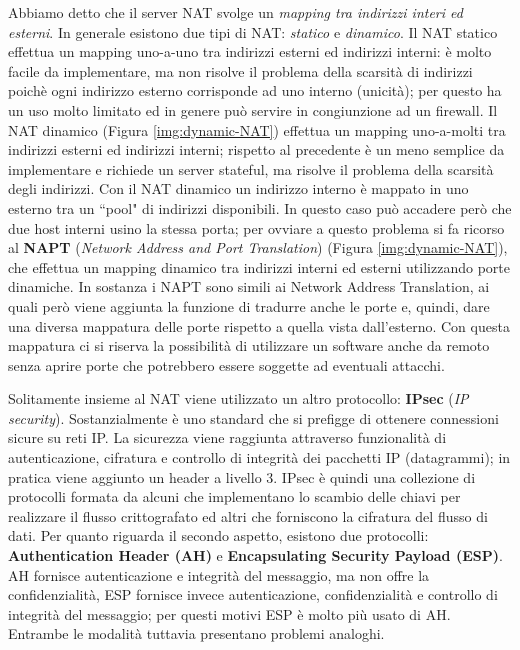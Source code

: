 Abbiamo detto che il server NAT svolge un \textit{mapping tra indirizzi interi ed esterni}. In generale esistono due tipi di NAT: \textit{statico} e \textit{dinamico}. Il NAT statico effettua un mapping uno-a-uno tra indirizzi esterni ed indirizzi interni: è molto facile da implementare, ma non risolve il problema della scarsità di indirizzi poichè ogni indirizzo esterno corrisponde ad uno interno (unicità); per questo ha un uso molto limitato ed in genere può servire in congiunzione ad un firewall. Il NAT dinamico (Figura \ref{img:dynamic-NAT}) effettua un mapping uno-a-molti tra indirizzi esterni ed indirizzi interni; rispetto al precedente è un meno semplice da implementare e richiede un server stateful, ma risolve il problema della scarsità degli indirizzi. Con il NAT dinamico un indirizzo interno è mappato in uno esterno tra un \textquotedblleft pool" di indirizzi disponibili. In questo caso può accadere però che due host interni usino la stessa porta; per ovviare a questo problema si fa ricorso al \textbf{NAPT} (\textit{Network Address and Port Translation}) (Figura \ref{img:dynamic-NAT}), che effettua un mapping dinamico tra indirizzi interni ed esterni utilizzando porte dinamiche. In sostanza i NAPT sono simili ai Network Address Translation, ai quali però viene aggiunta la funzione di tradurre anche le porte e, quindi, dare una diversa mappatura delle porte rispetto a quella vista dall'esterno. Con questa mappatura ci si riserva la possibilità di utilizzare un software anche da remoto senza aprire porte che potrebbero essere soggette ad eventuali attacchi.

Solitamente insieme al NAT viene utilizzato un altro protocollo: \textbf{IPsec} (\textit{IP security}). Sostanzialmente è uno standard che si prefigge di ottenere connessioni sicure su reti IP. La sicurezza viene raggiunta attraverso funzionalità di autenticazione, cifratura e controllo di integrità dei pacchetti IP (datagrammi); in pratica viene aggiunto un header a livello 3. IPsec è quindi una collezione di protocolli formata da alcuni che implementano lo scambio delle chiavi per realizzare il flusso crittografato ed altri che forniscono la cifratura del flusso di dati. Per quanto riguarda il secondo aspetto, esistono due protocolli: \textbf{Authentication Header (AH)} e \textbf{Encapsulating Security Payload (ESP)}. AH fornisce autenticazione e integrità del messaggio, ma non offre la confidenzialità, ESP fornisce invece autenticazione, confidenzialità e controllo di integrità del messaggio; per questi motivi ESP è molto più usato di AH. Entrambe le modalità tuttavia presentano problemi analoghi.

